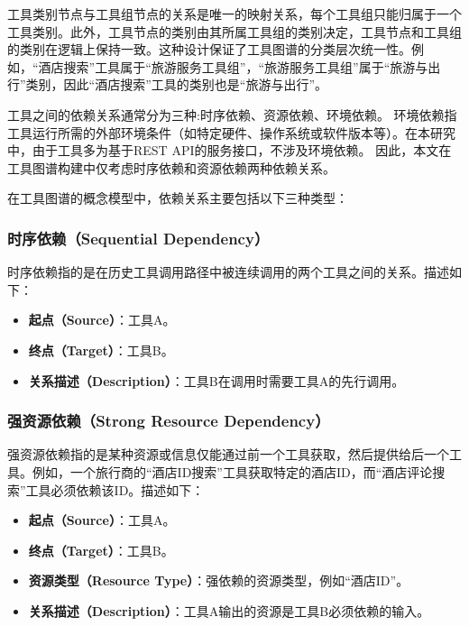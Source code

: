 工具类别节点与工具组节点的关系是唯一的映射关系，每个工具组只能归属于一个工具类别。此外，工具节点的类别由其所属工具组的类别决定，工具节点和工具组的类别在逻辑上保持一致。这种设计保证了工具图谱的分类层次统一性。例如，“酒店搜索”工具属于“旅游服务工具组”，“旅游服务工具组”属于“旅游与出行”类别，因此“酒店搜索”工具的类别也是“旅游与出行”。


工具之间的依赖关系通常分为三种\cite{shen2023taskbench}:时序依赖、资源依赖、环境依赖。
环境依赖指工具运行所需的外部环境条件（如特定硬件、操作系统或软件版本等）。在本研究中，由于工具多为基于REST API的服务接口，不涉及环境依赖。
因此，本文在工具图谱构建中仅考虑时序依赖和资源依赖两种依赖关系。

在工具图谱的概念模型中，依赖关系主要包括以下三种类型：

\subsubsection{时序依赖（Sequential Dependency）}
时序依赖指的是在历史工具调用路径中被连续调用的两个工具之间的关系。描述如下：
\begin{itemize}
    \item \textbf{起点（Source）}：工具A。
    \item \textbf{终点（Target）}：工具B。
    \item \textbf{关系描述（Description）}：工具B在调用时需要工具A的先行调用。
\end{itemize}

\subsubsection{强资源依赖（Strong Resource Dependency）}
强资源依赖指的是某种资源或信息仅能通过前一个工具获取，然后提供给后一个工具。例如，一个旅行商的“酒店ID搜索”工具获取特定的酒店ID，而“酒店评论搜索”工具必须依赖该ID。描述如下：
\begin{itemize}
    \item \textbf{起点（Source）}：工具A。
    \item \textbf{终点（Target）}：工具B。
    \item \textbf{资源类型（Resource Type）}：强依赖的资源类型，例如``酒店ID''。
    \item \textbf{关系描述（Description）}：工具A输出的资源是工具B必须依赖的输入。
\end{itemize}

